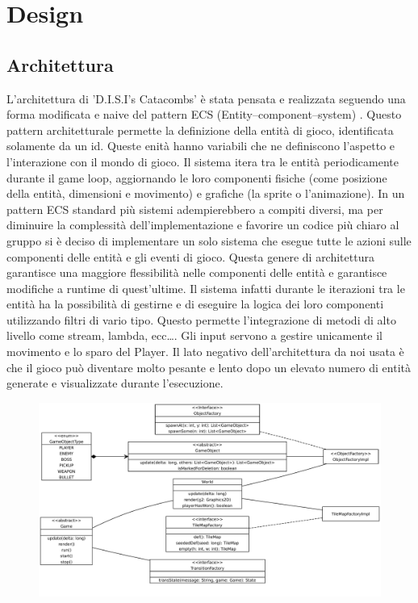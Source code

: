 \documentclass[a4paper,12pt]{report}
\begin{document}
    \chapter{Design}
    \section{Architettura}
    \par L'architettura di 'D.I.S.I's Catacombs' è stata pensata e realizzata seguendo una forma modificata e naive del pattern ECS (Entity–component–system)
    \cite{wiki:Entity_component_system}.
    Questo pattern architetturale permette la definizione della entità di gioco, identificata solamente da un id.
    Queste enità hanno variabili che ne definiscono l'aspetto e l'interazione con il mondo di gioco.
    Il sistema itera tra le entità periodicamente durante il game loop, aggiornando le loro componenti fisiche (come posizione della entità, dimensioni
    e movimento) e grafiche (la sprite o l'animazione).
    In un pattern ECS standard più sistemi adempierebbero a compiti diversi, ma per diminuire la complessità dell'implementazione e favorire
    un codice più chiaro al gruppo si è deciso di implementare un solo sistema che esegue tutte le azioni sulle componenti delle entità e gli eventi di gioco.
    Questa genere di architettura garantisce una maggiore flessibilità nelle componenti delle entità e garantisce modifiche a runtime di quest'ultime.
    Il sistema infatti durante le iterazioni tra le entità ha la possibilità di gestirne e di eseguire la logica dei loro componenti utilizzando filtri di
    vario tipo.
    Questo permette l'integrazione di metodi di alto livello come stream, lambda, ecc\ldots.
    Gli input servono a gestire unicamente il movimento e lo sparo del Player.
    Il lato negativo dell'architettura da noi usata è che il gioco può diventare molto pesante e lento dopo un elevato numero di entità generate e visualizzate
    durante l'esecuzione.
    \begin{figure}
        \includegraphics[width=\linewidth]{uml2}
    \end{figure}
\end{document}
